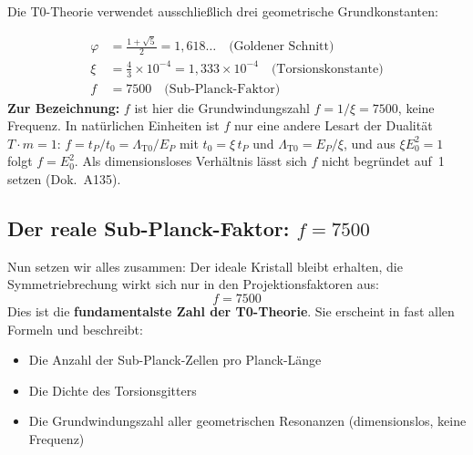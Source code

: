 	Die T0-Theorie verwendet ausschließlich drei geometrische Grundkonstanten:
	
	\begin{align}
		\varphi &= \frac{1 + \sqrt{5}}{2} = 1{,}618\ldots \quad \text{(Goldener Schnitt)} \\
		\xi &= \frac{4}{3} \times 10^{-4} = 1{,}333 \times 10^{-4} \quad \text{(Torsionskonstante)} \\
		f &= 7500 \quad \text{(Sub-Planck-Faktor)}
	\end{align}
	\textbf{Zur Bezeichnung:} $f$ ist hier die Grundwindungszahl $f = 1/\xi = 7500$, keine Frequenz. In natürlichen Einheiten ist $f$ nur eine andere Lesart der Dualität $T\cdot m = 1$: $f = t_P/t_0 = \Lambda_{\text{T0}}/E_P$ mit $t_0 = \xi\,t_P$ und $\Lambda_{\text{T0}} = E_P/\xi$, und aus $\xi E_0^2 = 1$ folgt $f = E_0^2$. Als dimensionsloses Verhältnis lässt sich $f$ nicht begründet auf~1 setzen (Dok.~A135).
	\subsection{Der reale Sub-Planck-Faktor: \(f = 7500\)}
	Nun setzen wir alles zusammen: Der ideale Kristall bleibt erhalten, die Symmetriebrechung wirkt sich nur in den Projektionsfaktoren aus:
	\begin{equation}
		\boxed{f = 7500}
	\end{equation}
	Dies ist die \textbf{fundamentalste Zahl der T0-Theorie}. Sie erscheint in fast allen Formeln und beschreibt:
	\begin{itemize}
		\item Die Anzahl der Sub-Planck-Zellen pro Planck-Länge
		\item Die Dichte des Torsionsgitters
		\item Die Grundwindungszahl aller geometrischen Resonanzen (dimensionslos, keine Frequenz)
	\end{itemize}
